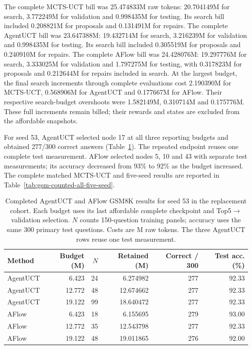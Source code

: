 The complete MCTS-UCT bill was 25.474833M raw tokens: 20.704149M for search,
3.772249M for validation and 0.998435M for testing. Its search bill included
0.208821M for proposals and 0.131491M for repairs.
The complete AgentUCT bill was 23.647388M: 19.432714M for search,
3.216239M for validation and 0.998435M for testing. Its search bill included
0.305519M for proposals and 0.240910M for repairs. The complete AFlow bill
was 24.428076M: 19.297776M for search, 3.333025M for validation and 1.797275M
for testing, with 0.317823M for proposals and 0.212644M for repairs included
in search. At the largest budget, the final search increments through
complete evaluations cost 2.190390M for MCTS-UCT, 0.568906M for AgentUCT
and 0.177667M for AFlow. Their respective search-budget overshoots were
1.582149M, 0.310714M and 0.175776M.
These full increments remain billed; their rewards and states are excluded
from the affordable snapshots.

For seed 53, AgentUCT selected node 17 at all three reporting budgets
and obtained 277/300 correct answers (Table~\ref{tab:gsm-counted-aflow-seed53}).
The repeated endpoint reuses one complete test measurement. AFlow selected
nodes 5, 10 and 43 with separate test measurements; its accuracy decreased
from 93\% to 92\% as the budget increased. The complete matched MCTS-UCT and five-seed results are reported in
Table~\ref{tab:gsm-counted-all-five-seed}.

\begin{table}[t]
\centering\small
\caption{Completed AgentUCT and AFlow GSM8K results for seed 53 in the
replacement cohort. Each budget uses its last affordable complete checkpoint
and Top5$\to$validation selection. $N$ counts 150-question training panels;
accuracy uses the same 300 primary test questions. Costs are M raw tokens.
The three AgentUCT rows reuse one test measurement.}
\label{tab:gsm-counted-aflow-seed53}
\setlength{\tabcolsep}{4pt}
\begin{tabular}{@{}lrrrrr@{}}
\toprule
Method & Budget (M) & $N$ & Retained (M) & Correct / 300 & Test acc. (\%)\\
\midrule
AgentUCT & 6.423 & 24 & 6.274982 & 277 & 92.33\\
AgentUCT & 12.772 & 48 & 12.674662 & 277 & 92.33\\
AgentUCT & 19.122 & 99 & 18.640472 & 277 & 92.33\\
AFlow & 6.423 & 18 & 6.155695 & 279 & 93.00\\
AFlow & 12.772 & 35 & 12.543798 & 277 & 92.33\\
AFlow & 19.122 & 48 & 19.011865 & 276 & 92.00\\
\bottomrule
\end{tabular}
\end{table}

